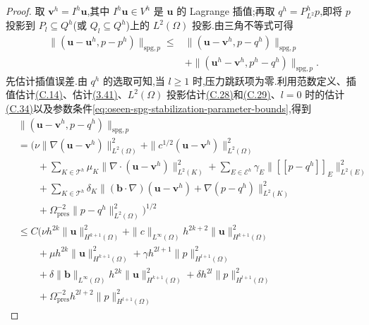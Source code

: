 \begin{proof}
取 $\bm{v}^h=I^h\bm{u}$,其中 $I^h\bm{u}\in V^h$ 是 $\bm{u}$ 的 Lagrange 插值;再取
$q^h=P_{L^2}^h p$,即将 $p$ 投影到 $P_l\subseteq Q^h$(或 $Q_l\subseteq Q^h$)上的 $L^2(\Omega)$ 投影.由三角不等式可得
\begin{equation}\label{eq:oseen-spg-error-splitting}
\begin{aligned}
 \|(\bm{u}-\bm{u}^h,p-p^h)\|_{\mathrm{spg},p}
 \le{}&\|(\bm{u}-\bm{v}^h,p-q^h)\|_{\mathrm{spg},p}\\
      &+\|(\bm{u}^h-\bm{v}^h,p^h-q^h)\|_{\mathrm{spg},p}.
\end{aligned}
\end{equation}
先估计插值误差.由 $q^h$ 的选取可知,当 $l\ge1$ 时,压力跳跃项为零.利用范数定义、插值估计\hyperref[eq:interpolation-error-estimate]{(C.14)}、估计\hyperref[eq:divergence-gradient-bound-h1]{(3.41)}、$L^2(\Omega)$ 投影估计\hyperref[eq:appendix-c-28]{(C.28)}和\hyperref[eq:appendix-c-29]{(C.29)}、$l=0$ 时的估计\hyperref[eq:appendix-c-34]{(C.34)}以及参数条件\cref{eq:oseen-spg-stabilization-parameter-bounds},得到
\begin{equation}\label{eq:oseen-spg-interpolation-error-estimate}
\begin{aligned}
 &\|(\bm{u}-\bm{v}^h,p-q^h)\|_{\mathrm{spg},p}\\
 &=\Biggl(\nu\|\nabla(\bm{u}-\bm{v}^h)\|_{L^2(\Omega)}^2
       +\|c^{1/2}(\bm{u}-\bm{v}^h)\|_{L^2(\Omega)}^2\\
 &\qquad+\sum_{K\in\mathcal{T}^h}
       \mu_K\|\nabla\cdot(\bm{u}-\bm{v}^h)\|_{L^2(K)}^2
       +\sum_{E\in\mathcal{E}^h}
       \gamma_E\|[\![p-q^h]\!]_E\|_{L^2(E)}^2\\
 &\qquad+\sum_{K\in\mathcal{T}^h}\delta_K
       \|(\bm{b}\cdot\nabla)(\bm{u}-\bm{v}^h)
                    +\nabla(p-q^h)\|_{L^2(K)}^2\\
 &\qquad+\Omega_{\mathrm{pres}}^{-2}
       \|p-q^h\|_{L^2(\Omega)}^2\Biggr)^{1/2}\\
 &\le C\Biggl(
       \nu h^{2k}\|\bm{u}\|_{H^{k+1}(\Omega)}^2
       +\|c\|_{L^\infty(\Omega)}h^{2k+2}
          \|\bm{u}\|_{H^{k+1}(\Omega)}^2\\
 &\qquad+\mu h^{2k}\|\bm{u}\|_{H^{k+1}(\Omega)}^2
       +\gamma h^{2l+1}\|p\|_{H^{l+1}(\Omega)}^2\\
 &\qquad+\delta\|\bm{b}\|_{L^\infty(\Omega)}
          h^{2k}\|\bm{u}\|_{H^{k+1}(\Omega)}^2
       +\delta h^{2l}\|p\|_{H^{l+1}(\Omega)}^2\\
 &\qquad+\Omega_{\mathrm{pres}}^{-2}h^{2l+2}
          \|p\|_{H^{l+1}(\Omega)}^2

\end{aligned}
\end{equation}
\end{proof}
